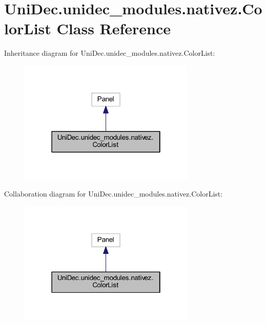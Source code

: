 \hypertarget{class_uni_dec_1_1unidec__modules_1_1nativez_1_1_color_list}{}\section{Uni\+Dec.\+unidec\+\_\+modules.\+nativez.\+Color\+List Class Reference}
\label{class_uni_dec_1_1unidec__modules_1_1nativez_1_1_color_list}


Inheritance diagram for Uni\+Dec.\+unidec\+\_\+modules.\+nativez.\+Color\+List\+:\nopagebreak
\begin{figure}[H]
\begin{center}
\leavevmode
\includegraphics[width=238pt]{class_uni_dec_1_1unidec__modules_1_1nativez_1_1_color_list__inherit__graph}
\end{center}
\end{figure}


Collaboration diagram for Uni\+Dec.\+unidec\+\_\+modules.\+nativez.\+Color\+List\+:\nopagebreak
\begin{figure}[H]
\begin{center}
\leavevmode
\includegraphics[width=238pt]{class_uni_dec_1_1unidec__modules_1_1nativez_1_1_color_list__coll__graph}
\end{center}
\end{figure}
